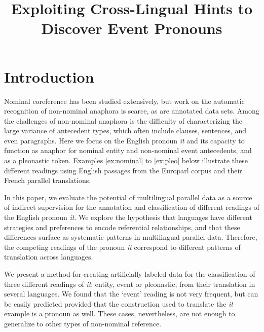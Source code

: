 \documentclass[10pt, a4paper]{article}
\title{Exploiting Cross-Lingual Hints to Discover Event Pronouns}
\begin{document}
\maketitleabstract

\section{Introduction}

\renewcommand{\thefootnote}{\fnsymbol{footnote}}


Nominal coreference has been studied extensively, but work on the automatic 
recognition of non-nominal anaphora is scarce, as are annotated data sets. Among 
the challenges of non-nominal anaphora is the difficulty of characterizing the 
large variance of antecedent types, which often include clauses, sentences, and 
even paragraphs. Here we focus on the English pronoun \textit{it} and its 
capacity to function as anaphor for nominal entity and non-nominal event 
antecedents, and as a pleonastic token. Examples \ref{ex:nominal} to 
\ref{ex:pleo} below illustrate these different readings using English passages 
from the Europarl corpus and their French parallel translations.


In this paper, we evaluate the potential of multilingual parallel data as a 
source of indirect supervision for the annotation and classification of 
different readings of the English 
pronoun \textit{it}. We explore the hypothesis that languages have different 
strategies and preferences to encode referential relationships, and that these 
differences surface as systematic patterns in multilingual parallel data. 
Therefore, the competing readings of the pronoun \textit{it} correspond to different patterns of translation across languages.  

We present a method for creating artificially labeled data for the 
classification of three different readings of \textit{it}: entity, event or 
pleonastic, from their translation in several languages. We found that the 
`event' reading is not very frequent, but can be easily predicted provided that 
the construction used to translate the \textit{it} example is a pronoun as well. These 
cases, nevertheless, are not enough to generalize to other types of non-nominal 
reference. %
\end{document}
